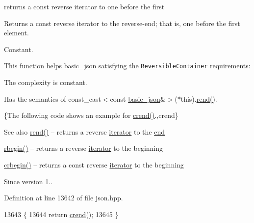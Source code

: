 returns a const reverse iterator to one before the first 

Returns a const reverse iterator to the reverse-\/end; that is, one before the first element.

  Constant.

This function helps {\ttfamily \hyperlink{classnlohmann_1_1basic__json}{basic\+\_\+json}} satisfying the \href{http://en.cppreference.com/w/cpp/concept/ReversibleContainer}{\tt Reversible\+Container} requirements\+:
\begin{DoxyItemize}
\item The complexity is constant.
\item Has the semantics of {\ttfamily const\+\_\+cast$<$const \hyperlink{classnlohmann_1_1basic__json}{basic\+\_\+json}\&$>$($\ast$this).\hyperlink{classnlohmann_1_1basic__json_ac77aed0925d447744676725ab0b6d535}{rend()}}.
\end{DoxyItemize}

\{The following code shows an example for {\ttfamily \hyperlink{classnlohmann_1_1basic__json_a5795b029dbf28e0cb2c7a439ec5d0a88}{crend()}}.,crend\}

\begin{DoxySeeAlso}{See also}
\hyperlink{classnlohmann_1_1basic__json_ac77aed0925d447744676725ab0b6d535}{rend()} -- returns a reverse \hyperlink{classnlohmann_1_1basic__json_a099316232c76c034030a38faa6e34dca}{iterator} to the \hyperlink{classnlohmann_1_1basic__json_a13e032a02a7fd8a93fdddc2fcbc4763c}{end} 

\hyperlink{classnlohmann_1_1basic__json_a1ef93e2006dbe52667294f5ef38b0b10}{rbegin()} -- returns a reverse \hyperlink{classnlohmann_1_1basic__json_a099316232c76c034030a38faa6e34dca}{iterator} to the beginning 

\hyperlink{classnlohmann_1_1basic__json_a1e0769d22d54573f294da0e5c6abc9de}{crbegin()} -- returns a const reverse \hyperlink{classnlohmann_1_1basic__json_a099316232c76c034030a38faa6e34dca}{iterator} to the beginning
\end{DoxySeeAlso}
\begin{DoxySince}{Since}
version 1.. 
\end{DoxySince}


Definition at line 13642 of file json.\+hpp.


\begin{DoxyCode}
13643     \{
13644         \textcolor{keywordflow}{return} \hyperlink{classnlohmann_1_1basic__json_a5795b029dbf28e0cb2c7a439ec5d0a88}{crend}();
13645     \}
\end{DoxyCode}
\mbox{\label{classnlohmann_1_1basic__json_a25e27ad0c6d53c01871c5485e1f75b96}} 
